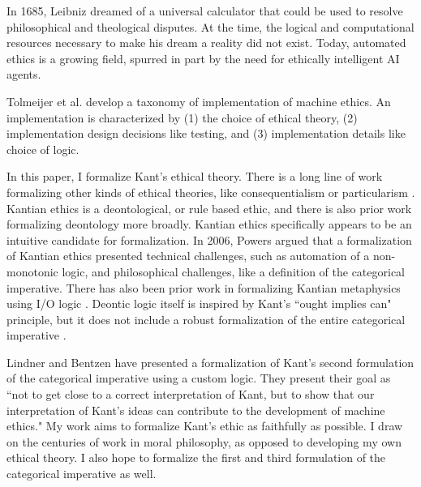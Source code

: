%
\begin{isabellebody}%
%
%
\isadelimtheory
%
\endisadelimtheory
%
\isatagtheory
%
\endisatagtheory
{\isafoldtheory}%
%
\isadelimtheory
%
\endisadelimtheory
%
\isadelimdocument
%
\endisadelimdocument
%
\isatagdocument
%
\isamarkuptrue%
%
\endisatagdocument
{\isafolddocument}%
%
\isadelimdocument
%
\endisadelimdocument
%
\begin{isamarkuptext}%
In 1685, Leibniz dreamed of a universal calculator that could be used to resolve philosophical 
and theological disputes. At the time, the logical and computational resources necessary to make his 
dream a reality did not exist. Today, automated ethics is a growing field, spurred in part by the need for
ethically intelligent AI agents. 

Tolmeijer et al. \cite{mesurvey} develop a taxonomy of implementation of machine ethics. An implementation is characterized
by (1) the choice of ethical theory, (2) implementation design decisions like testing, and (3) implementation
details like choice of logic.

In this paper, I formalize Kant's ethical theory. There is a long line of work formalizing other 
kinds of ethical theories, like consequentialism \cite{util1, util2} or particularism \cite{particularism1, particularism2}. 
Kantian ethics is a deontological, or rule based ethic, and there is also prior work formalizing deontology \cite{dde, deon1, deon2} more broadly. 
Kantian ethics specifically appears to be an intuitive candidate for formalization. In 2006, 
Powers \cite{powers} argued that a formalization of Kantian ethics presented technical challenges,
 such as automation of a non-monotonic logic, and philosophical challenges, like a definition of the 
categorical imperative. There has also been prior work in formalizing Kantian metaphysics using
 I/O logic \cite{io}. Deontic logic itself is inspired by Kant's ``ought implies can" principle, 
but it does not include a robust formalization of the entire categorical imperative \cite{cresswell}.

Lindner and Bentzen \cite{BL} have presented a formalization of Kant's second formulation of the categorical 
imperative using a custom logic. They present their goal as ``not to get close to a correct interpretation
 of Kant, but to show that our interpretation of Kant’s ideas can contribute to the development of 
machine ethics." My work aims to formalize Kant's ethic as faithfully as possible. I draw on the 
centuries of work in moral philosophy, as opposed to developing my own ethical theory. I also hope to 
formalize the first and third formulation of the categorical imperative as well.


\end{isamarkuptext}
\end{isabellebody}
